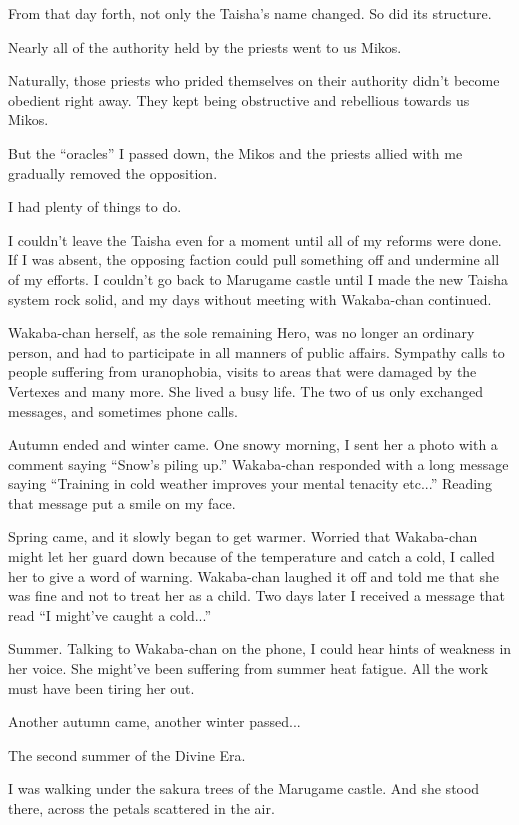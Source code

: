 From that day forth, not only the Taisha's name changed. So did its structure.

Nearly all of the authority held by the priests went to us Mikos.

Naturally, those priests who prided themselves on their authority didn't become obedient right away. They kept being obstructive and rebellious towards us Mikos.

But the ``oracles'' I passed down, the Mikos and the priests allied with me gradually removed the opposition.

I had plenty of things to do.

I couldn't leave the Taisha even for a moment until all of my reforms were done. If I was absent, the opposing faction could pull something off and undermine all of my efforts. I couldn't go back to Marugame castle until I made the new Taisha system rock solid, and my days without meeting with Wakaba-chan continued.

Wakaba-chan herself, as the sole remaining Hero, was no longer an ordinary person, and had to participate in all manners of public affairs. Sympathy calls to people suffering from uranophobia, visits to areas that were damaged by the Vertexes and many more. She lived a busy life. The two of us only exchanged messages, and sometimes phone calls.

Autumn ended and winter came. One snowy morning, I sent her a photo with a comment saying ``Snow's piling up.'' Wakaba-chan responded with a long message saying ``Training in cold weather improves your mental tenacity etc...'' Reading that message put a smile on my face.

Spring came, and it slowly began to get warmer. Worried that Wakaba-chan might let her guard down because of the temperature and catch a cold, I called her to give a word of warning. Wakaba-chan laughed it off and told me that she was fine and not to treat her as a child. Two days later I received a message that read ``I might've caught a cold...''

Summer. Talking to Wakaba-chan on the phone, I could hear hints of weakness in her voice. She might've been suffering from summer heat fatigue. All the work must have been tiring her out.

Another autumn came, another winter passed...

The second summer of the Divine Era.

I was walking under the sakura trees of the Marugame castle. And she stood there, across the petals scattered in the air.

